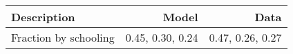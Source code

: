 \begin{tabular}{lrr}
\hline
Description & Model  & Data  \\
\hline
Fraction by schooling & 0.45, 0.30, 0.24  & 0.47, 0.26, 0.27  \\
\hline
\end{tabular}%

